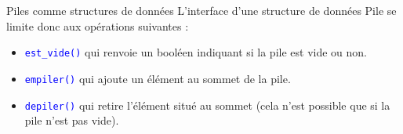 \documentclass[10pt]{beamer}
\begin{document}
\begin{frame}{\SL}
	\mframe{\SL}
	\begin{alertblock}{Piles comme structures de données}
		L'interface d'une structure de données Pile se limite donc aux opérations suivantes :
		\begin{itemize}[label=\textbullet]
			\item<2-> \textcolor{blue}{\tt est\_vide()} qui renvoie un booléen indiquant si la pile est vide ou non.
			\item<3-> \textcolor{blue}{\tt empiler()} qui ajoute un élément au sommet de la pile.
			\item<4-> \textcolor{blue}{\tt depiler()} qui retire l'élément situé au sommet (cela n'est possible que si la pile n'est pas vide).
		\end{itemize}
	\end{alertblock}
\end{frame}
\end{document}
